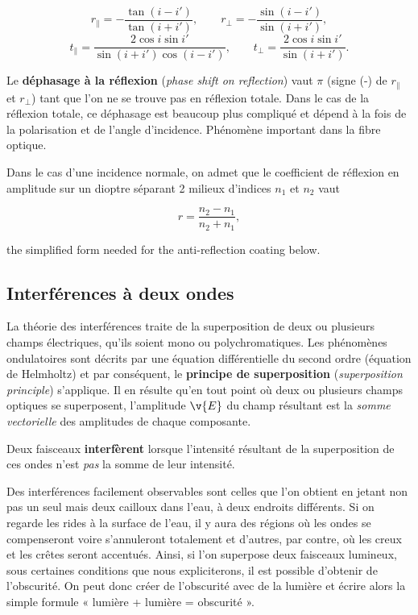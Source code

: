 \[ r_{\parallel} = -\frac{\tan(i-i')}{\tan(i+i')}, \qquad
   r_{\perp}     = -\frac{\sin(i-i')}{\sin(i+i')}, \]
\[ t_{\parallel} = \frac{2\cos i \sin i'}{\sin(i+i')\cos(i-i')}, \qquad
   t_{\perp}     = \frac{2\cos i \sin i'}{\sin(i+i')}. \]

\begin{remark}
  Le \textbf{déphasage à la réflexion} (\textit{phase shift on reflection}) vaut
  $\pi$ (signe (-) de $r_{\parallel}$ et $r_{\perp}$) tant que l'on ne se trouve
  pas en réflexion totale. Dans le cas de la réflexion totale, ce déphasage est
  beaucoup plus compliqué et dépend à la fois de la polarisation et de l'angle
  d'incidence. Phénomène important dans la fibre optique.
\end{remark}

Dans le cas d'une incidence normale, on admet que le coefficient de réflexion en
amplitude sur un dioptre séparant 2 milieux d'indices $n_1$ et $n_2$ vaut

\[ r = \frac{n_2 - n_1}{n_2 + n_1}, \]

the simplified form needed for the anti-reflection coating below.

\subsection{Interférences à deux ondes}

La théorie des interférences traite de la superposition de deux ou plusieurs
champs électriques, qu'ils soient mono ou polychromatiques. Les phénomènes
ondulatoires sont décrits par une équation différentielle du second ordre
(équation de Helmholtz) et par conséquent, le \textbf{principe de superposition}
(\textit{superposition principle}) s'applique. Il en résulte qu'en tout point où
deux ou plusieurs champs optiques se superposent, l'amplitude $\v{E}$ du champ
résultant est la \emph{somme vectorielle} des amplitudes de chaque composante.

\begin{definition}[Interférences]
  Deux faisceaux \textbf{interfèrent} lorsque l'intensité résultant de la
  superposition de ces ondes n'est \emph{pas} la somme de leur intensité.
\end{definition}

Des interférences facilement observables sont celles que l'on obtient en jetant
non pas un seul mais deux cailloux dans l'eau, à deux endroits différents. Si on
regarde les rides à la surface de l'eau, il y aura des régions où les ondes se
compenseront voire s'annuleront totalement et d'autres, par contre, où les creux
et les crêtes seront accentués. Ainsi, si l'on superpose deux faisceaux
lumineux, sous certaines conditions que nous expliciterons, il est possible
d'obtenir de l'obscurité. On peut donc créer de l'obscurité avec de la lumière et
écrire alors la simple formule « lumière + lumière = obscurité ».

